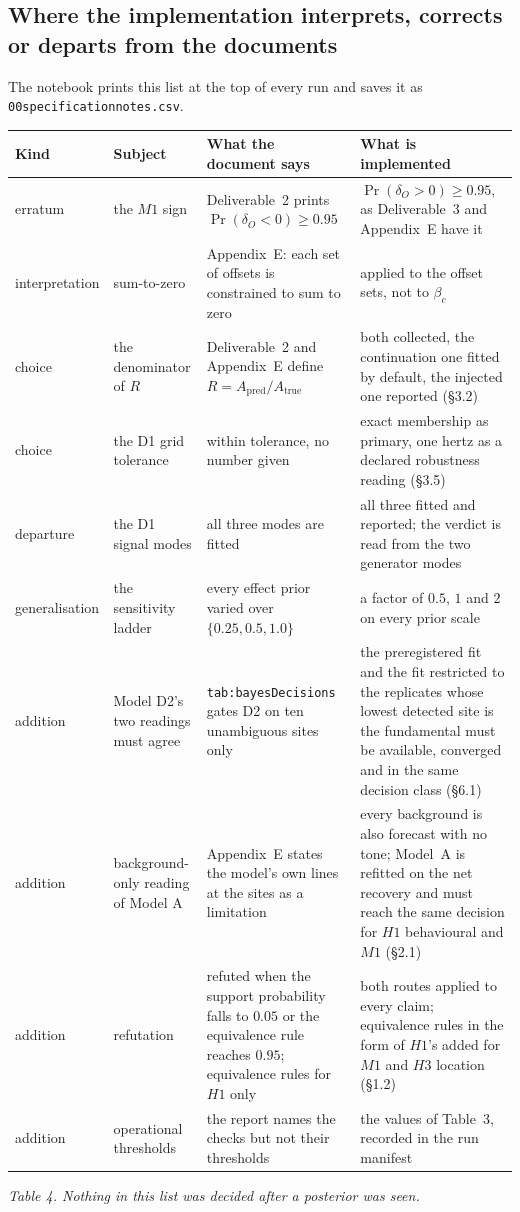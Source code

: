 \documentclass[10pt,a4paper]{article}
\newcommand{\code}[1]{\texttt{\UseBreakableUnderscores #1}}
\newcommand{\UseBreakableUnderscores}{\def\_{\textunderscore\allowbreak}}
\begin{document}
\subsection{Where the implementation interprets, corrects or departs from the documents}
The notebook prints this list at the top of every run and saves it as \code{00\_specification\_notes.csv}.
\begin{center}\small
\begin{longtable}{@{}L{1.9cm}L{2.9cm}L{4.8cm}L{5.8cm}@{}}
\toprule
\textbf{Kind} & \textbf{Subject} & \textbf{What the document says} & \textbf{What is implemented}\\
\midrule\endhead
erratum & the $M1$ sign & Deliverable~2 prints $\Pr(\delta_O<0)\ge0.95$ & $\Pr(\delta_O>0)\ge0.95$, as Deliverable~3 and Appendix~E have it\\
interpretation & sum-to-zero & Appendix~E: each set of offsets is constrained to sum to zero & applied to the offset sets, not to $\beta_c$\\
choice & the denominator of $R$ & Deliverable~2 and Appendix~E define $R=A_{\mathrm{pred}}/A_{\mathrm{true}}$ & both collected, the continuation one fitted by default, the injected one reported (§3.2)\\
choice & the D1 grid tolerance & within tolerance, no number given & exact membership as primary, one hertz as a declared robustness reading (§3.5)\\
departure & the D1 signal modes & all three modes are fitted & all three fitted and reported; the verdict is read from the two generator modes\\
generalisation & the sensitivity ladder & every effect prior varied over $\{0.25,0.5,1.0\}$ & a factor of $0.5$, $1$ and $2$ on every prior scale\\
addition & Model D2's two readings must agree & \code{tab:bayesDecisions} gates D2 on ten unambiguous sites only & the preregistered fit and the fit restricted to the replicates whose lowest detected site is the fundamental must be available, converged and in the same decision class (§6.1)\\
addition & background-only reading of Model A & Appendix~E states the model's own lines at the sites as a limitation & every background is also forecast with no tone; Model~A is refitted on the net recovery and must reach the same decision for $H1$ behavioural and $M1$ (§2.1)\\
addition & refutation & refuted when the support probability falls to $0.05$ or the equivalence rule reaches $0.95$; equivalence rules for $H1$ only & both routes applied to every claim; equivalence rules in the form of $H1$'s added for $M1$ and $H3$ location (§1.2)\\
addition & operational thresholds & the report names the checks but not their thresholds & the values of Table~3, recorded in the run manifest\\
\bottomrule
\end{longtable}
\end{center}
{\small\itshape Table 4. Nothing in this list was decided after a posterior was seen.}
\end{document}
